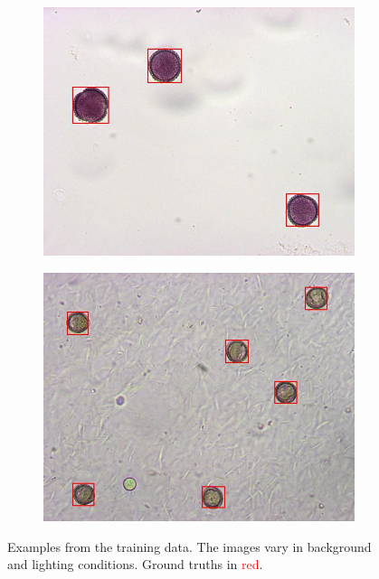 \begin{figure}[htbp]
  \begin{subfigure}[t]{0.4\textwidth}
    \centering
    \includegraphics[width=\textwidth]{figs/ex_02}
  \end{subfigure}%
  \hspace*{0.04\textwidth}
  \begin{subfigure}[t]{0.4\textwidth}
    \centering
    \includegraphics[width=\textwidth]{figs/ex_01}
  \end{subfigure}
  \caption[Examples from dataset]{
    Examples from the training data.
    The images vary in background and lighting conditions.
    Ground truths in \textcolor{red}{red}.}\label{fig:training}
\end{figure}


